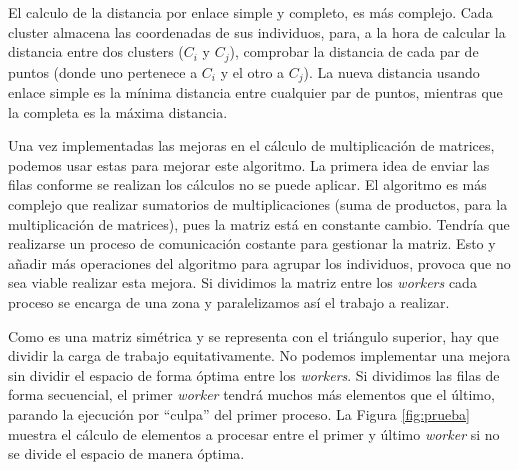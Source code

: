 		El calculo de la distancia por enlace simple y completo, es más complejo. Cada cluster almacena las coordenadas de sus individuos, para, a la hora de calcular la distancia entre dos clusters (\(C_{i}\) y \(C_{j}\)), comprobar la distancia de cada par de puntos (donde uno pertenece a \(C_{i}\) y el otro a \(C_{j}\)). La nueva distancia usando enlace simple es la mínima distancia entre cualquier par de puntos, mientras que la completa es la máxima distancia.
		
	
		Una vez implementadas las mejoras en el cálculo de multiplicación de matrices, podemos usar estas para mejorar este algoritmo. La primera idea de enviar las filas conforme se realizan los cálculos no se puede aplicar. El algoritmo es más complejo que realizar sumatorios de multiplicaciones (suma de productos, para la multiplicación de matrices), pues la matriz está en constante cambio. Tendría que realizarse un proceso de comunicación costante para gestionar la matriz. Esto y añadir más operaciones del algoritmo para agrupar los individuos, provoca que no sea viable realizar esta mejora. Si dividimos la matriz entre los \textit{workers} cada proceso se encarga de una zona y paralelizamos así el trabajo a realizar.
		
				
		Como es una matriz simétrica y se representa con el triángulo superior, hay que dividir la carga de trabajo equitativamente. No podemos implementar una mejora sin dividir el espacio de forma óptima entre los \textit{workers}. Si dividimos las filas de forma secuencial, el primer \textit{worker} tendrá muchos más elementos que el último, parando la ejecución por ``culpa'' del primer proceso. La Figura \ref{fig:prueba} muestra el cálculo de elementos a procesar entre el primer y último \textit{worker} si no se divide el espacio de manera óptima. 
		
		
		
